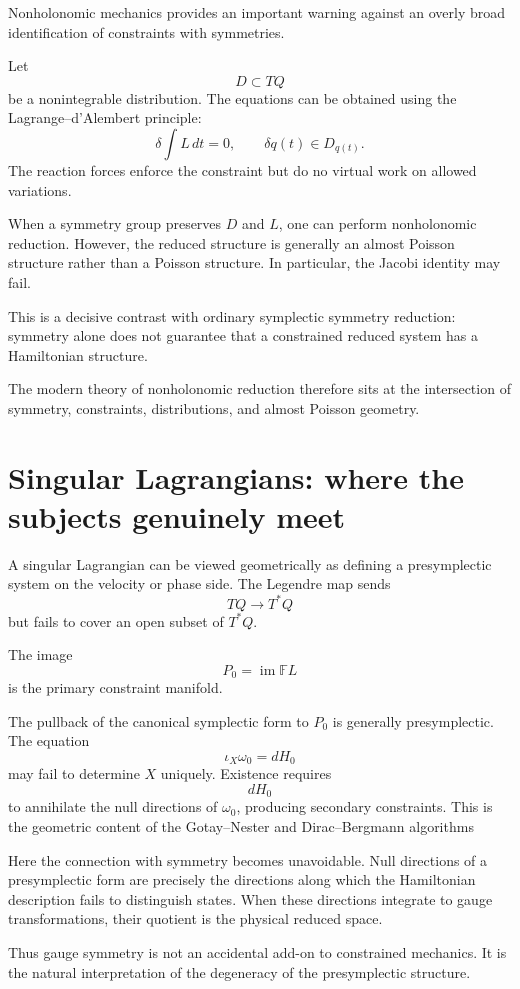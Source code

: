 Nonholonomic mechanics provides an important warning against an overly broad
identification of constraints with symmetries.

Let
\[
        D\subset TQ
\]
be a nonintegrable distribution.  The equations can be obtained using the
Lagrange--d'Alembert principle:
\[
        \delta\int L\,dt=0,
        \qquad
        \delta q(t)\in D_{q(t)}.
\]
The reaction forces enforce the constraint but do no virtual work on allowed
variations.

When a symmetry group preserves $D$ and $L$, one can perform nonholonomic
reduction.  However, the reduced structure is generally an almost Poisson
structure rather than a Poisson structure.  In particular, the Jacobi identity
may fail.

This is a decisive contrast with ordinary symplectic symmetry reduction:
symmetry alone does not guarantee that a constrained reduced system has a
Hamiltonian structure.

The modern theory of nonholonomic reduction therefore sits at the
intersection of symmetry, constraints, distributions, and almost Poisson
geometry.

\section{Singular Lagrangians: where the subjects genuinely meet}

A singular Lagrangian can be viewed geometrically as defining a presymplectic
system on the velocity or phase side.  The Legendre map sends
\[
        TQ\to T^*Q
\]
but fails to cover an open subset of $T^*Q$.

The image
\[
    P_0=\operatorname{im}\mathbb FL
\]
is the primary constraint manifold.

The pullback of the canonical symplectic form to $P_0$ is generally
presymplectic.  The equation
\[
        \iota_X\omega_0=d H_0
\]
may fail to determine $X$ uniquely.  Existence requires
\[
        d H_0
\]
to annihilate the null directions of $\omega_0$, producing secondary
constraints.  This is the geometric content of the Gotay--Nester and
Dirac--Bergmann algorithms


Here the connection with symmetry becomes unavoidable.  Null directions of a
presymplectic form are precisely the directions along which the Hamiltonian
description fails to distinguish states.  When these directions integrate to
gauge transformations, their quotient is the physical reduced space.

Thus gauge symmetry is not an accidental add-on to constrained mechanics.  It
is the natural interpretation of the degeneracy of the presymplectic
structure.


